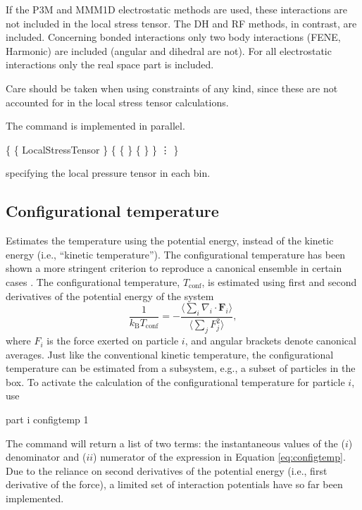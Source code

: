 If the P3M and MMM1D electrostatic methods are used, these
interactions are not included in the local stress tensor.  The DH and
RF methods, in contrast, are included. Concerning bonded interactions 
only two body interactions (FENE, Harmonic) are included (angular and dihedral are not).
For all electrostatic interactions only the real space part is included.

Care should be taken when using constraints of any kind, since these are not accounted for
in the local stress tensor calculations. 

The command is implemented in parallel.


\begin{code}
\{ \{ LocalStressTensor \}
   \{ \{    \} \{  \} \}
      \vdots
\}
\end{code}
specifying the local pressure tensor in each bin.

\subsection{Configurational temperature}
\label{analyze:configtemp}

\begin{essyntax}
  \begin{features}
  \end{features}
\end{essyntax}

Estimates the temperature using the potential energy, instead of the kinetic
energy (i.e., ``kinetic temperature'').  The configurational temperature has
been shown a more stringent criterion to reproduce a canonical ensemble in
certain cases \cite{allen06, bereau15}.  The configurational temperature,
$T_\textrm{conf}$, is estimated using first and second derivatives of the
potential energy of the system
\begin{equation}
  \label{eq:configtemp}
  \frac{1}{k_\textrm{B}T_\textrm{conf}} = - \frac{\langle \sum_i \nabla_i \cdot
    \mathbf{F}_i \rangle}{\langle \sum_j F_j^2 \rangle}, 
\end{equation}
where $F_i$ is the force exerted on particle $i$, and angular brackets denote
canonical averages.  Just like the conventional kinetic temperature, the
configurational temperature can be estimated from a subsystem, e.g., a subset
of particles in the box.  To activate the calculation of the configurational
temperature for particle $i$, use
\begin{code}
  part i configtemp 1
\end{code}
The command  will return a list of two terms: the
instantaneous values of the ($i$) denominator and ($ii$) numerator of the
expression in Equation \ref{eq:configtemp}.  Due to the reliance on second
derivatives of the potential energy (i.e., first derivative of the force), a
limited set of interaction potentials have so far been implemented.

